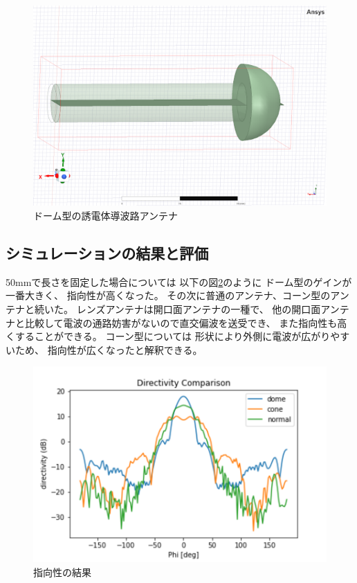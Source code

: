 \documentclass[technicalreport]{ieicej}
\begin{document}
\begin{figure}[tb]
  \begin{center}
    \includegraphics[bb=0 0 384 262, width=0.7\linewidth]{img/dome.pdf}
    \caption{ドーム型の誘電体導波路アンテナ}
    \label{fig:dome}
  \end{center}
\end{figure}

\subsection{シミュレーションの結果と評価}

50mmで長さを固定した場合については
以下の図\ref{fig:directivity_results}のように
ドーム型のゲインが一番大きく、
指向性が高くなった。
その次に普通のアンテナ、コーン型のアンテナと続いた。
レンズアンテナは開口面アンテナの一種で、
他の開口面アンテナと比較して電波の通路妨害がないので直交偏波を送受でき、
また指向性も高くすることができる。
コーン型については
形状により外側に電波が広がりやすいため、
指向性が広くなったと解釈できる。

\begin{figure}[tb]
  \begin{center}
    \includegraphics[bb=0.000000 0.000000 432.098422 288.065615, width=1.0\linewidth]{img/directivity_comparison.pdf}
    \caption{指向性の結果}
    \label{fig:directivity_results}
  \end{center}
\end{figure}
\end{document}
